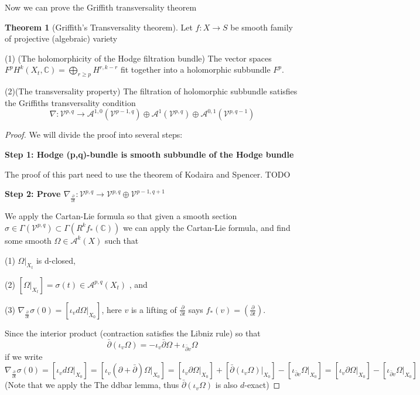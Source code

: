 \documentclass[11pt]{article}
\theoremstyle{definition}
\newtheorem{theorem}{Theorem}[section]
\begin{document}
	Now we can prove the Griffith transversality theorem
	\begin{theorem}[Griffith's Transversality theorem]
		Let $f:X\to S$ be smooth family of projective (algebraic) variety 
		
		(1) (The holomorphicity of the Hodge filtration bundle) The vector spaces $F^pH^k(X_t, \mathbb{C}) = \bigoplus_{r\ge p}{H}^{r,k-r}$ fit together into a holomorphic subbundle $F^p$.
		
		(2)(The transversality property) The filtration of holomorphic subbundle satisfies the Griffiths transversality condition
		$$\nabla : \mathcal{V}^{p,q}\to \mathcal{A}^{1,0}(\mathcal{V}^{p-1,q})\oplus \mathcal{A}^{1}(\mathcal{V}^{p,q})\oplus \mathcal{A}^{0,1}(\mathcal{V}^{p,q-1})$$	
	\end{theorem}
	\begin{proof}
	We will divide the proof into several steps:
	
	\textbf{Step 1: Hodge (p,q)-bundle is smooth subbundle of the Hodge bundle}
	
	The proof of this part need to use the theorem of Kodaira and Spencer. TODO
	
	\textbf{Step 2: Prove $\nabla _{\frac{\partial }{\partial  t}}: \mathcal{V}^{p,q}\to \mathcal{V}^{p,q}\oplus \mathcal{V}^{p-1,q+1}$ }
	
	We apply the Cartan-Lie formula so that given a smooth section $\sigma \in \Gamma(\mathcal{V}^{p,q})\subset  \Gamma(R^kf_* (\mathbb{C}))$ we can apply the Cartan-Lie formula, and find some smooth $\Omega \in \mathcal{A}^{k}(X)$ such that
	
	(1) $\Omega|_{X_t}$ is d-closed,
	
	(2) $[\Omega|_{X_t}] = \sigma(t) \in \mathcal{A}^{p,q}(X_t)$ , and 
	
	(3) $\nabla_{\frac{\partial }{\partial t}} \sigma (0 ) =  [\iota_v d \Omega|_{X_0}]$, here $v$ is a lifting of $\frac{\partial }{\partial t}$ says $f_* (v) =  \left(\frac{\partial }{\partial t}\right)$.
	
	Since the interior product (contraction satisfies the Libniz rule) so that $$\bar{\partial} (\iota_v \Omega) =  - \iota_v  \bar{\partial}\Omega +  \iota_{ \bar{\partial} v} \Omega$$if we write $$ \nabla _{\frac{\partial  }{\partial t}}  \sigma(0) = [\iota_v d \Omega |_{X_0}] = [\iota_v  (\partial+ \bar{\partial} )\Omega|_{X_0}] =  [\iota_v  \partial \Omega |_{X_0}] + [\bar{\partial} (\iota_v \Omega)|_{X_0} ]-  [\iota_{\bar{\partial} v} \Omega|_{X_0}]  =  [\iota_v \partial \Omega|_{X_0} ] - [\iota_{\bar{\partial} v}\Omega|_{X_0}]$$
	(Note that we apply the The ddbar lemma, thus $\bar{\partial}(\iota_v \Omega)$ is also $d$-exact)
	

\end{proof}
\end{document}
